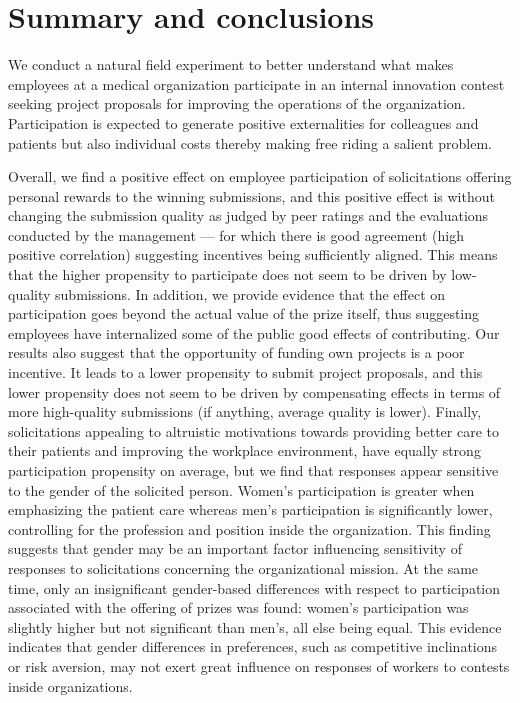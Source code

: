\documentclass[11pt]{article}
\begin{document}
\section{Summary and conclusions}\label{summary-and-conclusions}

We conduct a natural field experiment to better understand what makes
employees at a medical organization participate in an internal
innovation contest seeking project proposals for improving the
operations of the organization. Participation is expected to generate
positive externalities for colleagues and patients but also individual
costs thereby making free riding a salient problem.

Overall, we find a positive effect on employee participation of
solicitations offering personal rewards to the winning submissions, and
this positive effect is without changing the submission quality as
judged by peer ratings and the evaluations conducted by the management
--- for which there is good agreement (high positive correlation)
suggesting incentives being sufficiently aligned. This means that the
higher propensity to participate does not seem to be driven by
low-quality submissions. In addition, we provide evidence that the
effect on participation goes beyond the actual value of the prize
itself, thus suggesting employees have internalized some of the public
good effects of contributing. Our results also suggest that the
opportunity of funding own projects is a poor incentive. It leads to a
lower propensity to submit project proposals, and this lower propensity
does not seem to be driven by compensating effects in terms of more
high-quality submissions (if anything, average quality is lower).
Finally, solicitations appealing to altruistic motivations towards
providing better care to their patients and improving the workplace
environment, have equally strong participation propensity on average,
but we find that responses appear sensitive to the gender of the
solicited person. Women's participation is greater when emphasizing the
patient care whereas men's participation is significantly lower,
controlling for the profession and position inside the organization.
This finding suggests that gender may be an important factor influencing
sensitivity of responses to solicitations concerning the organizational
mission. At the same time, only an insignificant gender-based
differences with respect to participation associated with the offering
of prizes was found: women's participation was slightly higher but not
significant than men's, all else being equal. This evidence indicates
that gender differences in preferences, such as competitive inclinations
or risk aversion, may not exert great influence on responses of workers
to contests inside organizations.
\end{document}
